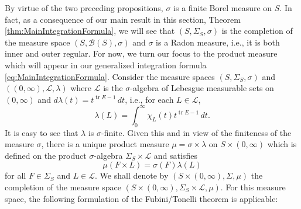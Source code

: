 \documentclass[11pt]{article}
\theoremstyle{theorem}
\newcommand\tr{\operatorname{tr}}
\begin{document}
\noindent By virtue of the two preceding propositions, $\sigma$ is a finite Borel measure on $S$. In fact, as a consequence of our main result in this section, Theorem \ref{thm:MainIntegrationFormula}, we will see that $(S,\Sigma_S,\sigma)$ is the completion of the measure space $(S,\mathcal{B}(S),\sigma)$ and $\sigma$ is a Radon measure, i.e., it is both inner and outer regular. For now, we turn our focus to the product measure which will appear in our generalized integration formula \eqref{eq:MainIntegrationFormula}. Consider the measure spaces $(S,\Sigma_S,\sigma)$ and $((0,\infty),\mathcal{L},\lambda)$ where $\mathcal{L}$ is the $\sigma$-algebra of Lebesgue measurable sets on $(0,\infty)$ and $d\lambda(t)=t^{\tr E-1}\,dt$, i.e., for each $L\in\mathcal{L}$,
\begin{equation*}
\lambda(L)=\int_0^\infty \chi_{L}(t)t^{\tr E-1}\,dt.
\end{equation*}
It is easy to see that $\lambda$ is $\sigma$-finite. Given this and in view of the finiteness of the measure $\sigma$, there is a unique product measure $\mu=\sigma\times \lambda$ on $S\times (0,\infty)$ which is defined on the product $\sigma$-algebra $\Sigma_S\times \mathcal{L}$ and satisfies
\begin{equation*}
\mu(F\times L)=\sigma(F)\lambda(L)
\end{equation*}
for all $F\in \Sigma_S$ and $L\in\mathcal{L}$. We shall denote by $(S\times (0,\infty),\Sigma,\mu)$ the completion of the measure space $(S\times (0,\infty),\Sigma_S\times\mathcal{L},\mu)$. For this measure space, the following formulation of the Fubini/Tonelli theorem is applicable:
\end{document}
